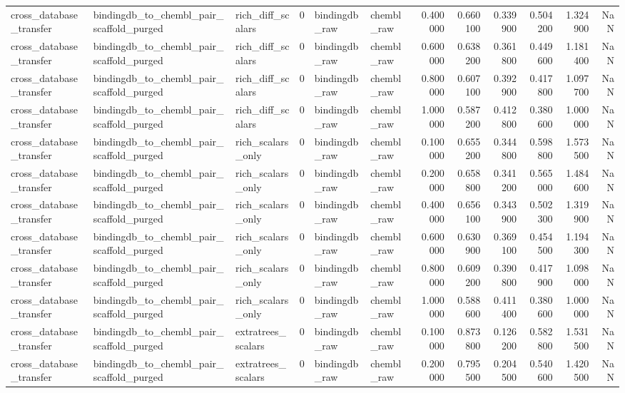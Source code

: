 \begin{longtable}{lllrllrrrrrr}
cross\_database\_transfer & bindingdb\_to\_chembl\_pair\_scaffold\_purged & rich\_diff\_scalars & 0 & bindingdb\_raw & chembl\_raw & 0.400000 & 0.660100 & 0.339900 & 0.504200 & 1.324900 & NaN \\
cross\_database\_transfer & bindingdb\_to\_chembl\_pair\_scaffold\_purged & rich\_diff\_scalars & 0 & bindingdb\_raw & chembl\_raw & 0.600000 & 0.638200 & 0.361800 & 0.449600 & 1.181400 & NaN \\
cross\_database\_transfer & bindingdb\_to\_chembl\_pair\_scaffold\_purged & rich\_diff\_scalars & 0 & bindingdb\_raw & chembl\_raw & 0.800000 & 0.607100 & 0.392900 & 0.417800 & 1.097700 & NaN \\
cross\_database\_transfer & bindingdb\_to\_chembl\_pair\_scaffold\_purged & rich\_diff\_scalars & 0 & bindingdb\_raw & chembl\_raw & 1.000000 & 0.587200 & 0.412800 & 0.380600 & 1.000000 & NaN \\
cross\_database\_transfer & bindingdb\_to\_chembl\_pair\_scaffold\_purged & rich\_scalars\_only & 0 & bindingdb\_raw & chembl\_raw & 0.100000 & 0.655200 & 0.344800 & 0.598800 & 1.573500 & NaN \\
cross\_database\_transfer & bindingdb\_to\_chembl\_pair\_scaffold\_purged & rich\_scalars\_only & 0 & bindingdb\_raw & chembl\_raw & 0.200000 & 0.658800 & 0.341200 & 0.565000 & 1.484600 & NaN \\
cross\_database\_transfer & bindingdb\_to\_chembl\_pair\_scaffold\_purged & rich\_scalars\_only & 0 & bindingdb\_raw & chembl\_raw & 0.400000 & 0.656100 & 0.343900 & 0.502300 & 1.319900 & NaN \\
cross\_database\_transfer & bindingdb\_to\_chembl\_pair\_scaffold\_purged & rich\_scalars\_only & 0 & bindingdb\_raw & chembl\_raw & 0.600000 & 0.630900 & 0.369100 & 0.454500 & 1.194300 & NaN \\
cross\_database\_transfer & bindingdb\_to\_chembl\_pair\_scaffold\_purged & rich\_scalars\_only & 0 & bindingdb\_raw & chembl\_raw & 0.800000 & 0.609200 & 0.390800 & 0.417900 & 1.098000 & NaN \\
cross\_database\_transfer & bindingdb\_to\_chembl\_pair\_scaffold\_purged & rich\_scalars\_only & 0 & bindingdb\_raw & chembl\_raw & 1.000000 & 0.588600 & 0.411400 & 0.380600 & 1.000000 & NaN \\
cross\_database\_transfer & bindingdb\_to\_chembl\_pair\_scaffold\_purged & extratrees\_scalars & 0 & bindingdb\_raw & chembl\_raw & 0.100000 & 0.873800 & 0.126200 & 0.582800 & 1.531500 & NaN \\
cross\_database\_transfer & bindingdb\_to\_chembl\_pair\_scaffold\_purged & extratrees\_scalars & 0 & bindingdb\_raw & chembl\_raw & 0.200000 & 0.795500 & 0.204500 & 0.540600 & 1.420500 & NaN \\

\end{longtable}
